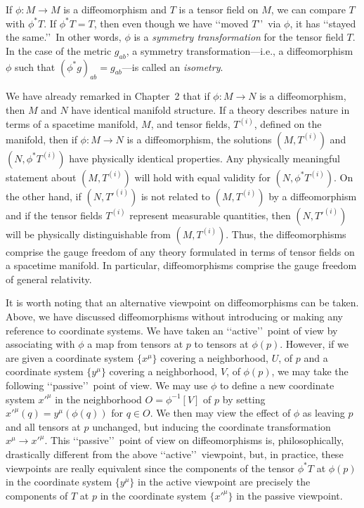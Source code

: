 If \(\phi:M\to M\) is a diffeomorphism and \(T\) is a tensor field on \(M\), we can
compare \(T\) with \(\phi^*T\). If \(\phi^*T=T\), then even though we have
\lq\lq moved \(T\)\rq\rq\ via \(\phi\), it has \lq\lq stayed the same.\rq\rq\ In
other words, \(\phi\) is a \emph{symmetry transformation} for the tensor field \(T\).
In the case of the metric \(g_{ab}\), a symmetry transformation---i.e., a
diffeomorphism \(\phi\) such that \((\phi^*g)_{ab}=g_{ab}\)---is called an
\emph{isometry}.

We have already remarked in Chapter~2 that if \(\phi:M\to N\) is a diffeomorphism,
then \(M\) and \(N\) have identical manifold structure. If a theory describes nature
in terms of a spacetime manifold, \(M\), and tensor fields, \(T^{(i)}\), defined on
the manifold, then if \(\phi:M\to N\) is a diffeomorphism, the solutions
\((M,T^{(i)})\) and \((N,\phi^*T^{(i)})\) have physically identical properties. Any
physically meaningful statement about \((M,T^{(i)})\) will hold with equal validity
for \((N,\phi^*T^{(i)})\). On the other hand, if \((N,T'^{(i)})\) is not related to
\((M,T^{(i)})\) by a diffeomorphism and if the tensor fields \(T^{(i)}\) represent
measurable quantities, then \((N,T'^{(i)})\) will be physically distinguishable from
\((M,T^{(i)})\). Thus, the diffeomorphisms comprise the gauge freedom of any theory
formulated in terms of tensor fields on a spacetime manifold. In particular,
diffeomorphisms comprise the gauge freedom of general relativity.

It is worth noting that an alternative viewpoint on diffeomorphisms can be taken.
Above, we have discussed diffeomorphisms without introducing or making any
reference to coordinate systems. We have taken an \lq\lq active\rq\rq\ point of view
by associating with \(\phi\) a map from tensors at \(p\) to tensors at \(\phi(p)\).
However, if we are given a coordinate system \(\{x^\mu\}\) covering a neighborhood,
\(U\), of \(p\) and a coordinate system \(\{y^\mu\}\) covering a neighborhood,
\(V\), of \(\phi(p)\), we may take the following \lq\lq passive\rq\rq\ point of view.
We may use \(\phi\) to define a new coordinate system \(x'^\mu\) in the neighborhood
\(O=\phi^{-1}[V]\) of \(p\) by setting \(x'^\mu(q)=y^\mu(\phi(q))\) for \(q\in O\).
We then may view the effect of \(\phi\) as leaving \(p\) and all tensors at \(p\)
unchanged, but inducing the coordinate transformation \(x^\mu\to x'^\mu\). This
\lq\lq passive\rq\rq\ point of view on diffeomorphisms is, philosophically,
drastically different from the above \lq\lq active\rq\rq\ viewpoint, but, in
practice, these viewpoints are really equivalent since the components of the tensor
\(\phi^*T\) at \(\phi(p)\) in the coordinate system \(\{y^\mu\}\) in the active
viewpoint are precisely the components of \(T\) at \(p\) in the coordinate system
\(\{x'^\mu\}\) in the passive viewpoint.
